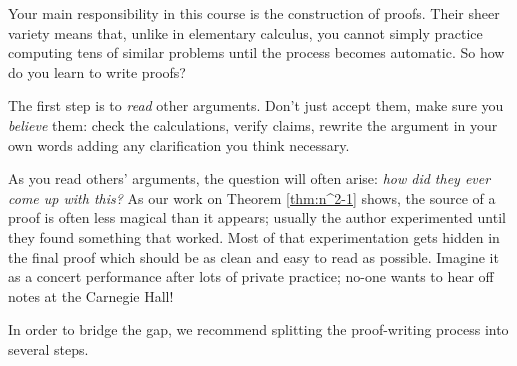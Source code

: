 
Your main responsibility in this course is the construction of proofs. Their sheer variety means that, unlike in elementary calculus, you cannot simply practice computing tens of similar problems until the process becomes automatic. So how do you learn to write proofs?\smallbreak

The first step is to \emph{read} other arguments. Don't just accept them, make sure you \emph{believe} them: check the calculations, verify claims, rewrite the argument in your own words adding any clarification you think necessary.\smallbreak

As you read others' arguments, the question will often arise: \emph{how did they ever come up with this?} As our work on Theorem \ref{thm:n^2-1} shows, the source of a proof is often less magical than it appears; usually the author experimented until they found something that worked. Most of that experimentation gets hidden in the final proof which should be as clean and easy to read as possible. Imagine it as a concert performance after lots of private practice; no-one wants to hear off notes at the Carnegie Hall!\smallbreak

In order to bridge the gap, we recommend splitting the proof-writing process into several steps.

